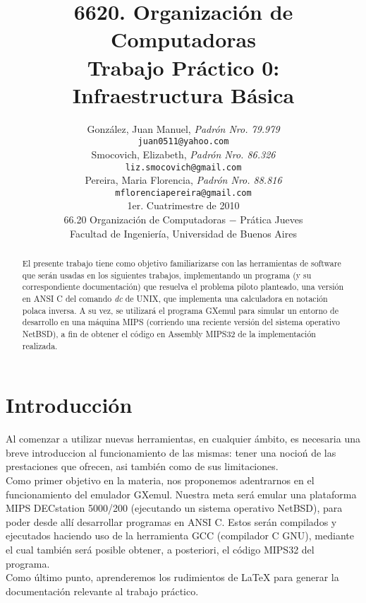\documentclass[a4paper,10pt]{article}
\title{ \textbf{ 6620. Organizaci\'on de Computadoras\\
Trabajo Pr\'actico 0: \\
Infraestructura B\'asica}}
\author{	Gonz\'alez, Juan Manuel, \textit{Padr\'on Nro. 79.979} \\
            	\texttt{ juan0511@yahoo.com } \\[2.5ex]
		Smocovich, Elizabeth, \textit{Padr\'on Nro. 86.326} \\
            	\texttt{ liz.smocovich@gmail.com } \\[2.5ex]
            	Pereira, Maria Florencia, \textit{Padr\'on Nro. 88.816} \\
            	\texttt{ mflorenciapereira@gmail.com } \\[2.5ex]
            	\normalsize{1er. Cuatrimestre de 2010} \\
            	\normalsize{66.20 Organizaci\'on de Computadoras  $-$ Pr\'atica Jueves} \\
            	\normalsize{Facultad de Ingenier\'ia, Universidad de Buenos Aires} \\
       }
\date{}
\begin{document}
\maketitle
\thispagestyle{empty}  %


\begin{abstract}
El presente trabajo tiene como objetivo familiarizarse con las herramientas de software que ser\'an usadas en los siguientes trabajos, implementando un programa (y su correspondiente documentaci\'on) que resuelva el problema piloto planteado, una versi\'on en ANSI C del comando \textit{dc} de UNIX, que implementa una calculadora en notaci\'on polaca inversa. A su vez, se utilizar\'a el programa GXemul para simular un entorno de desarrollo en una m\'aquina MIPS (corriendo una reciente versi\'on del sistema operativo NetBSD), a fin de obtener el c\'odigo en Assembly MIPS32 de la implementaci\'on realizada.

\end{abstract}

\pagebreak

\pagestyle{empty}
\section{Introducci\'on}
Al comenzar a utilizar nuevas herramientas, en cualquier \'ambito, es necesaria una breve introduccion al funcionamiento de las mismas: tener una nocio\'n de las prestaciones que ofrecen, asi tambi\'en como de sus limitaciones.\\
Como primer objetivo en la materia, nos proponemos adentrarnos en el funcionamiento del emulador GXemul. Nuestra meta ser\'a emular una plataforma MIPS DECstation 5000/200 (ejecutando un sistema operativo NetBSD), para poder desde all\'i desarrollar programas en ANSI C. Estos ser\'an compilados y ejecutados haciendo uso de la herramienta GCC (compilador C GNU), mediante el cual tambi\'en ser\'a posible obtener, a posteriori, el c\'odigo MIPS32 del programa.\\
Como \'ultimo punto, aprenderemos los rudimientos de LaTeX para generar la documentaci\'on relevante al trabajo pr\'actico.
\end{document}
